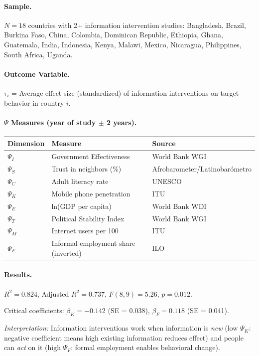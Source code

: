 \paragraph{Sample.}
$N = 18$ countries with 2+ information intervention studies: Bangladesh, Brazil, Burkina Faso, China, Colombia, Dominican Republic, Ethiopia, Ghana, Guatemala, India, Indonesia, Kenya, Malawi, Mexico, Nicaragua, Philippines, South Africa, Uganda.

\paragraph{Outcome Variable.}
$\tau_i$ = Average effect size (standardized) of information interventions on target behavior in country $i$.

\paragraph{$\Psi$ Measures (year of study $\pm$ 2 years).}
\begin{center}
\small
\begin{tabular}{@{}lll@{}}
\toprule
\textbf{Dimension} & \textbf{Measure} & \textbf{Source} \\
\midrule
$\Psi_I$ & Government Effectiveness & World Bank WGI \\
$\Psi_S$ & Trust in neighbors (\%) & Afrobarometer/Latinobarómetro \\
$\Psi_C$ & Adult literacy rate & UNESCO \\
$\Psi_K$ & Mobile phone penetration & ITU \\
$\Psi_E$ & ln(GDP per capita) & World Bank WDI \\
$\Psi_T$ & Political Stability Index & World Bank WGI \\
$\Psi_M$ & Internet users per 100 & ITU \\
$\Psi_F$ & Informal employment share (inverted) & ILO \\
\bottomrule
\end{tabular}
\end{center}

\paragraph{Results.}
$R^2 = 0.824$, Adjusted $R^2 = 0.737$, $F(8,9) = 5.26$, $p = 0.012$.

Critical coefficients: $\beta_K = -0.142$ (SE = 0.038), $\beta_F = 0.118$ (SE = 0.041).

\textit{Interpretation:} Information interventions work when information is \textit{new} (low $\Psi_K$: negative coefficient means high existing information reduces effect) and people can \textit{act} on it (high $\Psi_F$: formal employment enables behavioral change).

